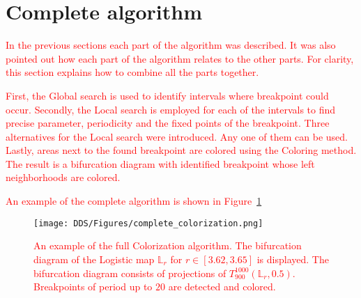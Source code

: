 \section{Complete algorithm}
\textcolor{red}{
In the previous sections each part of the algorithm was described.
It was also pointed out how each part of the algorithm relates to the other parts.
For clarity, this section explains how to combine all the parts together.
}
\par
\textcolor{red}{
First, the Global search is used to identify intervals where breakpoint could occur.
Secondly, the Local search is employed for each of the intervals to find precise parameter, periodicity and the fixed points of the breakpoint.
Three alternatives for the Local search were introduced.
Any one of them can be used.
Lastly, areas next to the found breakpoint are colored using the Coloring method.
The result is a bifurcation diagram with identified breakpoint whose left neighborhoods are colored.
}
\par
\textcolor{red}{
An example of the complete algorithm is shown in Figure~\ref{fig:complete_colorization}
}

\begin{figure}[!h]
    \centering
    \texttt{[image: DDS/Figures/complete\_colorization.png]}
    \caption{
        \textcolor{red}{
        An example of the full Colorization algorithm.
        The bifurcation diagram of the Logistic map $\mathbb{L}_{r}$ for $r \in [ 3.62, 3.65 ]$ is displayed.
        The bifurcation diagram consists of projections of $T_{900}^{1000}(\mathbb{L}_{r}, 0.5)$.
        Breakpoints of period up to $20$ are detected and colored.
        }
    }
    \label{fig:complete_colorization}
\end{figure}

\endinput